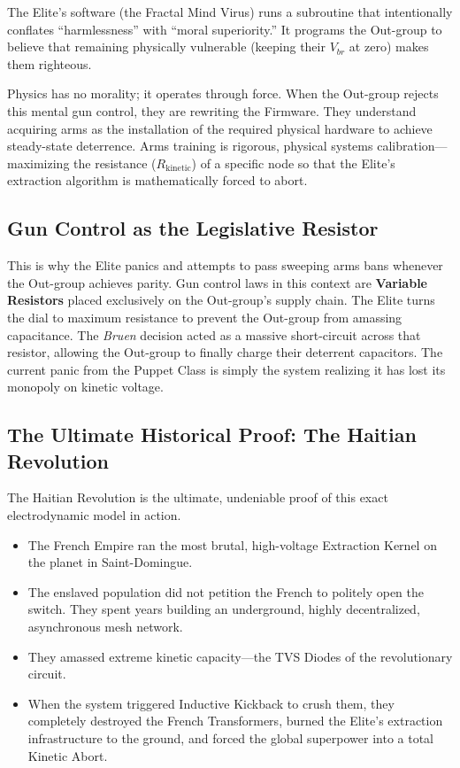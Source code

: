 The Elite's software (the Fractal Mind Virus) runs a subroutine that intentionally conflates ``harmlessness'' with ``moral superiority.'' It programs the Out-group to believe that remaining physically vulnerable (keeping their $V_{br}$ at zero) makes them righteous.

Physics has no morality; it operates through force. When the Out-group rejects this mental gun control, they are rewriting the Firmware. They understand acquiring arms as the installation of the required physical hardware to achieve steady-state deterrence. Arms training is rigorous, physical systems calibration---maximizing the resistance ($R_{\text{kinetic}}$) of a specific node so that the Elite's extraction algorithm is mathematically forced to abort.

\subsection{Gun Control as the Legislative Resistor}

This is why the Elite panics and attempts to pass sweeping arms bans whenever the Out-group achieves parity. Gun control laws in this context are \textbf{Variable Resistors} placed exclusively on the Out-group's supply chain. The Elite turns the dial to maximum resistance to prevent the Out-group from amassing capacitance. The \textit{Bruen} decision acted as a massive short-circuit across that resistor, allowing the Out-group to finally charge their deterrent capacitors. The current panic from the Puppet Class is simply the system realizing it has lost its monopoly on kinetic voltage.

\subsection{The Ultimate Historical Proof: The Haitian Revolution}

The Haitian Revolution is the ultimate, undeniable proof of this exact electrodynamic model in action.
\begin{itemize}
\item The French Empire ran the most brutal, high-voltage Extraction Kernel on the planet in Saint-Domingue.
\item The enslaved population did not petition the French to politely open the switch. They spent years building an underground, highly decentralized, asynchronous mesh network.
\item They amassed extreme kinetic capacity---the TVS Diodes of the revolutionary circuit.
\item When the system triggered Inductive Kickback to crush them, they completely destroyed the French Transformers, burned the Elite's extraction infrastructure to the ground, and forced the global superpower into a total Kinetic Abort.
\end{itemize}

